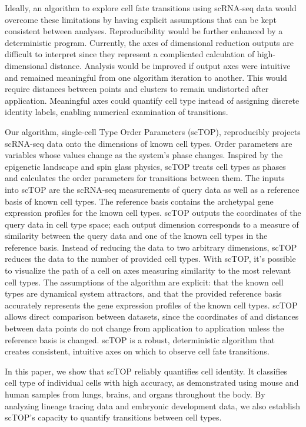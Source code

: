 \documentclass[aps,superscriptaddress, notitlepage,longbibliography]{revtex4-1}
\begin{document}
Ideally, an algorithm to explore cell fate transitions using scRNA-seq data would overcome these limitations by having explicit assumptions that can be kept consistent between analyses. Reproducibility would be further enhanced by a deterministic program. Currently, the axes of dimensional reduction outputs are difficult to interpret since they represent a complicated calculation of high-dimensional distance. Analysis would be improved if output axes were intuitive and remained meaningful from one algorithm iteration to another. This would require distances between points and clusters to remain undistorted after application. Meaningful axes could quantify cell type instead of assigning discrete identity labels, enabling numerical examination of transitions.

Our algorithm, single-cell Type Order Parameters (scTOP), reproducibly projects scRNA-seq data onto the dimensions of known cell types. Order parameters are variables whose values change as the system’s phase changes. Inspired by the epigenetic landscape and spin glass physics, scTOP treats cell types as phases and calculates the order parameters for transitions between them. The inputs into scTOP are the scRNA-seq measurements of query data as well as a reference basis of known cell types. The reference basis contains the archetypal gene expression profiles for the known cell types. scTOP outputs the coordinates of the query data in cell type space; each output dimension corresponds to a measure of similarity between the query data and one of the known cell types in the reference basis. Instead of reducing the data to two arbitrary dimensions, scTOP reduces the data to the number of provided cell types. With scTOP, it’s possible to visualize the path of a cell on axes measuring similarity to the most relevant cell types. The assumptions of the algorithm are explicit: that the known cell types are dynamical system attractors, and that the provided reference basis accurately represents the gene expression profiles of the known cell types. scTOP allows direct comparison between datasets, since the coordinates of and distances between data points do not change from application to application unless the reference basis is changed. scTOP is a robust, deterministic algorithm that creates consistent, intuitive axes on which to observe cell fate transitions.

In this paper, we show that scTOP reliably quantifies cell identity. It classifies cell type of individual cells with high accuracy, as demonstrated using mouse and human samples from lungs, brains, and organs throughout the body. By analyzing lineage tracing data and embryonic development data, we also establish scTOP’s capacity to quantify transitions between cell types. 
\end{document}
